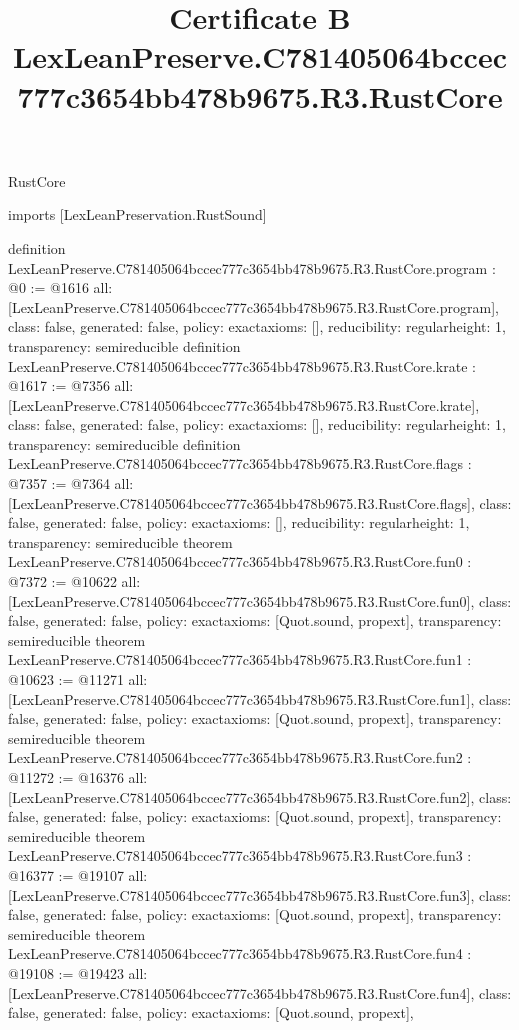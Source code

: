 \begin{lexlean}{RustCore}
\title{Certificate B LexLeanPreserve.C781405064bccec777c3654bb478b9675.R3.RustCore}
\begin{coremodule}
imports [LexLeanPreservation.RustSound]

definition LexLeanPreserve.C781405064bccec777c3654bb478b9675.R3.RustCore.program : @0 := @1616 {
  all: [LexLeanPreserve.C781405064bccec777c3654bb478b9675.R3.RustCore.program],
  class: false,
  generated: false,
  policy: exact{axioms: []},
  reducibility: regular{height: 1},
  transparency: semireducible
}
definition LexLeanPreserve.C781405064bccec777c3654bb478b9675.R3.RustCore.krate : @1617 := @7356 {
  all: [LexLeanPreserve.C781405064bccec777c3654bb478b9675.R3.RustCore.krate],
  class: false,
  generated: false,
  policy: exact{axioms: []},
  reducibility: regular{height: 1},
  transparency: semireducible
}
definition LexLeanPreserve.C781405064bccec777c3654bb478b9675.R3.RustCore.flags : @7357 := @7364 {
  all: [LexLeanPreserve.C781405064bccec777c3654bb478b9675.R3.RustCore.flags],
  class: false,
  generated: false,
  policy: exact{axioms: []},
  reducibility: regular{height: 1},
  transparency: semireducible
}
theorem LexLeanPreserve.C781405064bccec777c3654bb478b9675.R3.RustCore.fun0 : @7372 := @10622 {
  all: [LexLeanPreserve.C781405064bccec777c3654bb478b9675.R3.RustCore.fun0],
  class: false,
  generated: false,
  policy: exact{axioms: [Quot.sound, propext]},
  transparency: semireducible
}
theorem LexLeanPreserve.C781405064bccec777c3654bb478b9675.R3.RustCore.fun1 : @10623 := @11271 {
  all: [LexLeanPreserve.C781405064bccec777c3654bb478b9675.R3.RustCore.fun1],
  class: false,
  generated: false,
  policy: exact{axioms: [Quot.sound, propext]},
  transparency: semireducible
}
theorem LexLeanPreserve.C781405064bccec777c3654bb478b9675.R3.RustCore.fun2 : @11272 := @16376 {
  all: [LexLeanPreserve.C781405064bccec777c3654bb478b9675.R3.RustCore.fun2],
  class: false,
  generated: false,
  policy: exact{axioms: [Quot.sound, propext]},
  transparency: semireducible
}
theorem LexLeanPreserve.C781405064bccec777c3654bb478b9675.R3.RustCore.fun3 : @16377 := @19107 {
  all: [LexLeanPreserve.C781405064bccec777c3654bb478b9675.R3.RustCore.fun3],
  class: false,
  generated: false,
  policy: exact{axioms: [Quot.sound, propext]},
  transparency: semireducible
}
theorem LexLeanPreserve.C781405064bccec777c3654bb478b9675.R3.RustCore.fun4 : @19108 := @19423 {
  all: [LexLeanPreserve.C781405064bccec777c3654bb478b9675.R3.RustCore.fun4],
  class: false,
  generated: false,
  policy: exact{axioms: [Quot.sound, propext]},
}
\end{coremodule}
\end{lexlean}

